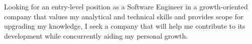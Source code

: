
Looking for an entry-level position as a Software Engineer in a
growth-oriented company that values my analytical and technical skills
and provides scope for upgrading my knowledge, I seek a company that
will help me contribute to its development while concurrently aiding
my personal growth.
